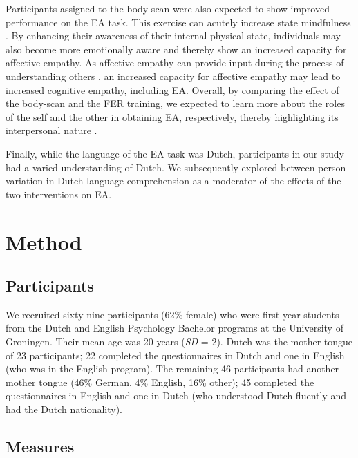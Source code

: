 \documentclass[authordate, empirical, issue]{jote-new-article}
\begin{document}
Participants assigned to the body-scan were also expected to show improved performance on the EA task. This exercise can acutely increase state mindfulness \parencites{Upton2019}. By enhancing their awareness of their internal physical state, individuals may also become more emotionally aware and thereby show an increased capacity for affective empathy. As affective empathy can provide input during the process of understanding others \parencites{Cuff2016}, an increased capacity for affective empathy may lead to increased cognitive empathy, including EA. Overall, by comparing the effect of the body-scan and the FER training, we expected to learn more about the roles of the self and the other in obtaining EA, respectively, thereby highlighting its interpersonal nature \parencites{Zaki2008}.



Finally, while the language of the EA task was Dutch, participants in our study had a varied understanding of Dutch. We subsequently explored between-person variation in Dutch-language comprehension as a moderator of the effects of the two interventions on EA.







\section{Method}



\subsection{Participants}



We recruited sixty-nine participants (62\% female) who were first-year students from the Dutch and English Psychology Bachelor programs at the University of Groningen. Their mean age was 20 years (\emph{SD }= 2). Dutch was the mother tongue of 23 participants; 22 completed the questionnaires in Dutch and one in English (who was in the English program). The remaining 46 participants had another mother tongue (46\% German, 4\% English, 16\% other); 45 completed the questionnaires in English and one in Dutch (who understood Dutch fluently and had the Dutch nationality).



\subsection{Measures}
\end{document}
